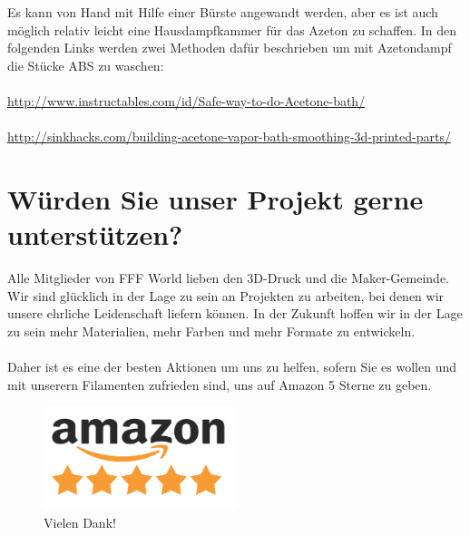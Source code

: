 \documentclass[11pt,a4paper]{article}
\begin{document}
Es kann von Hand mit Hilfe einer Bürste angewandt werden, aber es ist auch möglich relativ leicht eine Hausdampfkammer für das Azeton zu schaffen. In den folgenden Links werden zwei Methoden dafür beschrieben um mit Azetondampf die Stücke ABS zu waschen:
\\\\
\url{http://www.instructables.com/id/Safe-way-to-do-Acetone-bath/}\\\\
\url{http://sinkhacks.com/building-acetone-vapor-bath-smoothing-3d-printed-parts/}
\section{Würden Sie unser Projekt gerne unterstützen?}
Alle Mitglieder von FFF World lieben den 3D-Druck und die Maker-Gemeinde. Wir sind glücklich in der Lage zu sein an Projekten zu arbeiten, bei denen wir unsere ehrliche Leidenschaft liefern können. In der Zukunft hoffen wir in der Lage zu sein mehr Materialien, mehr Farben und mehr Formate zu entwickeln.
\\\\
Daher ist es eine der besten Aktionen um uns zu helfen, sofern Sie es wollen und mit unserern Filamenten zufrieden sind, uns auf Amazon 5 Sterne zu geben.
\begin{figure}[H]
\centering
\includegraphics[width=0.5\textwidth,cfbox=azul_marcos 1pt 0pt]{FOTOS/AMAZON_FIVE_STARS}
\caption*{Vielen Dank!}
\end{figure}
\end{document}
